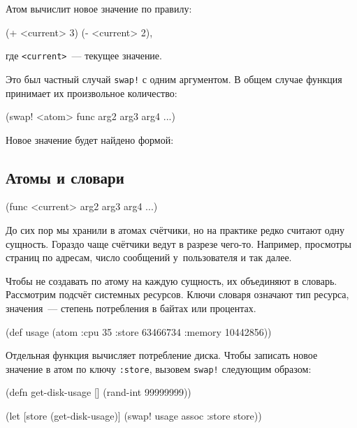 Атом вычислит новое значение по правилу:

\begin{english}
  \begin{clojure}
(+ <current> 3)
(- <current> 2),
  \end{clojure}
\end{english}

\noindent
где \verb|<current>|~--- текущее значение.

Это был частный случай \verb|swap!| с одним аргументом. В общем случае функция
принимает их произвольное количество:

\begin{english}
  \begin{clojure}
(swap! <atom> func arg2 arg3 arg4 ...)
  \end{clojure}
\end{english}

\noindent
Новое значение будет найдено формой:

\subsection{Атомы и словари}

\begin{english}
  \begin{clojure}
(func <current> arg2 arg3 arg4 ...)
  \end{clojure}
\end{english}

До сих пор мы хранили в атомах счётчики, но на практике редко считают одну
сущность. Гораздо чаще счётчики ведут в разрезе чего-то. Например, просмотры
страниц по адресам, число сообщений у~пользователя и так далее.

Чтобы не создавать по атому на каждую сущность, их объединяют в
словарь. Рассмотрим подсчёт системных ресурсов. Ключи словаря означают тип
ресурса, значения~--- степень потребления в байтах или процентах.

\begin{english}
  \begin{clojure}
(def usage
  (atom {:cpu 35
         :store 63466734
         :memory 10442856}))
  \end{clojure}
\end{english}

Отдельная функция вычисляет потребление диска. Чтобы записать новое значение в
атом по ключу \verb|:store|, вызовем \verb|swap!| следующим образом:

\begin{english}
  \begin{clojure}
(defn get-disk-usage []
  (rand-int 99999999))

(let [store (get-disk-usage)]
  (swap! usage assoc :store store))
  \end{clojure}
\end{english}

